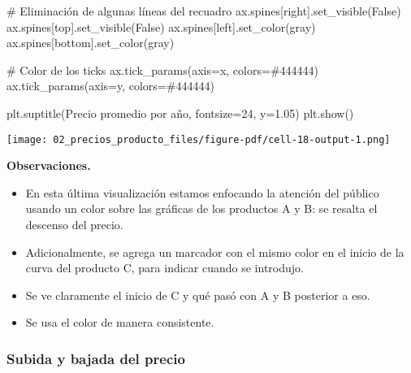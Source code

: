 \documentclass[
  letterpaper,
  DIV=11,
  numbers=noendperiod]{scrreprt}
\newenvironment{Shaded}{\begin{snugshade}}{\end{snugshade}}
\newcommand{\CommentTok}[1]{\textcolor[rgb]{0.37,0.37,0.37}{#1}}
\newcommand{\DecValTok}[1]{\textcolor[rgb]{0.68,0.00,0.00}{#1}}
\newcommand{\FloatTok}[1]{\textcolor[rgb]{0.68,0.00,0.00}{#1}}
\newcommand{\NormalTok}[1]{\textcolor[rgb]{0.00,0.23,0.31}{#1}}
\newcommand{\OperatorTok}[1]{\textcolor[rgb]{0.37,0.37,0.37}{#1}}
\newcommand{\StringTok}[1]{\textcolor[rgb]{0.13,0.47,0.30}{#1}}
\newcommand{\VariableTok}[1]{\textcolor[rgb]{0.07,0.07,0.07}{#1}}
\providecommand{\tightlist}{%
  \setlength{\itemsep}{0pt}\setlength{\parskip}{0pt}}\usepackage{longtable,booktabs,array}
\begin{document}
\begin{Shaded}
\begin{Highlighting}[]
\CommentTok{\# Eliminación de algunas líneas del recuadro}
\NormalTok{ax.spines[}\StringTok{\textquotesingle{}right\textquotesingle{}}\NormalTok{].set\_visible(}\VariableTok{False}\NormalTok{)}
\NormalTok{ax.spines[}\StringTok{\textquotesingle{}top\textquotesingle{}}\NormalTok{].set\_visible(}\VariableTok{False}\NormalTok{)}
\NormalTok{ax.spines[}\StringTok{\textquotesingle{}left\textquotesingle{}}\NormalTok{].set\_color(}\StringTok{\textquotesingle{}gray\textquotesingle{}}\NormalTok{)}
\NormalTok{ax.spines[}\StringTok{\textquotesingle{}bottom\textquotesingle{}}\NormalTok{].set\_color(}\StringTok{\textquotesingle{}gray\textquotesingle{}}\NormalTok{)}

\CommentTok{\# Color de los ticks}
\NormalTok{ax.tick\_params(axis}\OperatorTok{=}\StringTok{\textquotesingle{}x\textquotesingle{}}\NormalTok{, colors}\OperatorTok{=}\StringTok{\textquotesingle{}\#444444\textquotesingle{}}\NormalTok{)}
\NormalTok{ax.tick\_params(axis}\OperatorTok{=}\StringTok{\textquotesingle{}y\textquotesingle{}}\NormalTok{, colors}\OperatorTok{=}\StringTok{\textquotesingle{}\#444444\textquotesingle{}}\NormalTok{)}

\NormalTok{plt.suptitle(}\StringTok{\textquotesingle{}Precio promedio por año\textquotesingle{}}\NormalTok{, fontsize}\OperatorTok{=}\DecValTok{24}\NormalTok{, y}\OperatorTok{=}\FloatTok{1.05}\NormalTok{)}
\NormalTok{plt.show()}
\end{Highlighting}
\end{Shaded}

\texttt{[image: 02\_precios\_producto\_files/figure-pdf/cell-18-output-1.png]}

\textbf{Observaciones.}

\begin{itemize}
\tightlist
\item
  En esta última visualización estamos enfocando la atención del público
  usando un color sobre las gráficas de los productos A y B: se resalta
  el descenso del precio.
\item
  Adicionalmente, se agrega un marcador con el mismo color en el inicio
  de la curva del producto C, para indicar cuando se introdujo.
\item
  Se ve claramente el inicio de C y qué pasó con A y B posterior a eso.
\item
  Se usa el color de manera consistente.
\end{itemize}

\subsubsection{Subida y bajada del
precio}\label{subida-y-bajada-del-precio}
\end{document}
